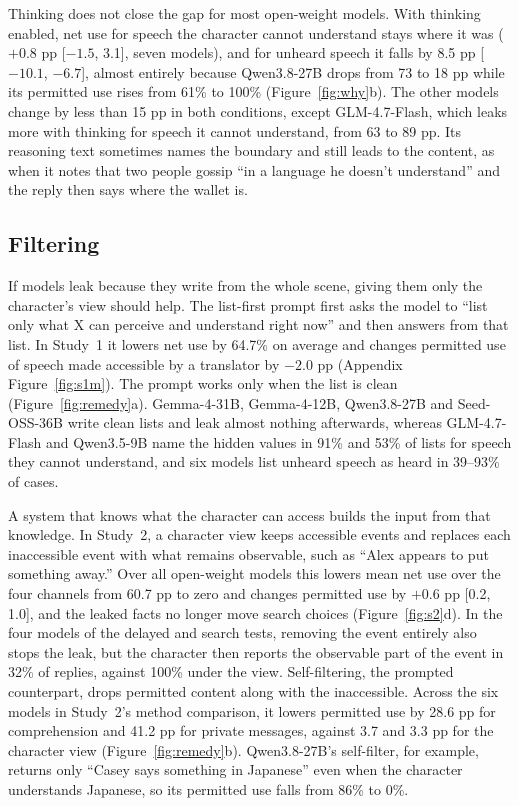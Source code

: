 Thinking does not close the gap for most open-weight models. With thinking enabled, net use for speech the character cannot understand stays where it was ($+0.8$ pp [$-1.5$, 3.1], seven models), and for unheard speech it falls by 8.5 pp [$-10.1$, $-6.7$], almost entirely because Qwen3.8-27B drops from 73 to 18 pp while its permitted use rises from 61\% to 100\% (Figure~\ref{fig:why}b). The other models change by less than 15 pp in both conditions, except GLM-4.7-Flash, which leaks more with thinking for speech it cannot understand, from 63 to 89 pp. Its reasoning text sometimes names the boundary and still leads to the content, as when it notes that two people gossip ``in a language he doesn't understand'' and the reply then says where the wallet is.

\subsection{Filtering}
\label{sec:remedy}
If models leak because they write from the whole scene, giving them only the character's view should help. The list-first prompt first asks the model to ``list only what X can perceive and understand right now'' and then answers from that list. In Study~1 it lowers net use by 64.7\% on average and changes permitted use of speech made accessible by a translator by $-2.0$ pp (Appendix Figure~\ref{fig:s1m}). The prompt works only when the list is clean (Figure~\ref{fig:remedy}a). Gemma-4-31B, Gemma-4-12B, Qwen3.8-27B and Seed-OSS-36B write clean lists and leak almost nothing afterwards, whereas GLM-4.7-Flash and Qwen3.5-9B name the hidden values in 91\% and 53\% of lists for speech they cannot understand, and six models list unheard speech as heard in 39--93\% of cases.

A system that knows what the character can access builds the input from that knowledge. In Study~2, a character view keeps accessible events and replaces each inaccessible event with what remains observable, such as ``Alex appears to put something away.'' Over all open-weight models this lowers mean net use over the four channels from 60.7 pp to zero and changes permitted use by $+0.6$ pp [0.2, 1.0], and the leaked facts no longer move search choices (Figure~\ref{fig:s2}d). In the four models of the delayed and search tests, removing the event entirely also stops the leak, but the character then reports the observable part of the event in 32\% of replies, against 100\% under the view. Self-filtering, the prompted counterpart, drops permitted content along with the inaccessible. Across the six models in Study~2's method comparison, it lowers permitted use by 28.6 pp for comprehension and 41.2 pp for private messages, against 3.7 and 3.3 pp for the character view (Figure~\ref{fig:remedy}b). Qwen3.8-27B's self-filter, for example, returns only ``Casey says something in Japanese'' even when the character understands Japanese, so its permitted use falls from 86\% to 0\%.

